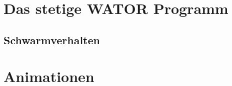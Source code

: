 \documentclass[a4paper,11pt]{article}
\theoremstyle{definition}
\numberwithin{equation}{section}
\begin{document}
	\section{Das stetige WATOR Programm}
	\subsection{Schwarmverhalten}

	\section{Animationen}
	
	\listoffigures
	


	\nocite{*}
	\printbibliography[heading=bibintoc]%
	
\end{document}
